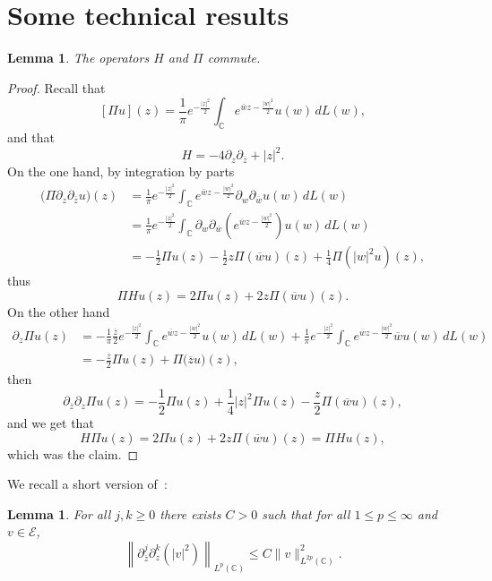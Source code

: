 \documentclass[10pt]{amsart}
\newtheorem{lemm}[theo]{Lemma}\newtheorem{prop}[theo]{Proposition}\newtheorem{coro}[theo]{Corollary}\newtheorem{conj}[theo]{Conjecture}
\theoremstyle{definition}\newtheorem{defi}[theo]{Definition}\newtheorem{rema}[theo]{Remark}\newtheorem{exam}[theo]{Example}\newtheorem{exem}[theo]{Example}\newtheorem{nota}[theo]{Notation}
\newcommand{\C}{\mathbb{C}}
\newcommand{\E}{\mathcal{E}}
\newcommand{\ov}{\overline}
\newcommand{\<}{\langle}
\renewcommand{\>}{\rangle}
\begin{document}
\section{Some technical results}



\begin{lemm}\label{lem-comm}
The operators $H$ and $\Pi$ commute.
\end{lemm}

\begin{proof}
Recall that
\[
[\Pi u](z) = \frac{1}{\pi} e^{-\frac{|z|^2}{2}} \int_\C e^{\ov w z - \frac{|w|^2}{2}} u(w) \,dL(w),
\]
and that
\[
H=-4\partial_z \partial_{\ov z}+|z|^2.
\]
On the one hand, by integration by parts
\begin{align*}
\big(\Pi \partial_z\partial_{\ov z} u\big)(z)&= \frac{1}{\pi} e^{-\frac{|z|^2}{2}} \int_\C e^{\ov w z - \frac{|w|^2}{2}} \partial_w\partial_{\ov w} u(w) \,dL(w)\\
&= \frac{1}{\pi} e^{-\frac{|z|^2}{2}} \int_\C \partial_w\partial_{\ov w} \left(e^{\ov w z - \frac{|w|^2}{2}}\right) u(w) \,dL(w)\\
&= -\frac12 \Pi u(z)-\frac12 z \Pi(\ov{w}u)(z)+\frac14 \Pi\left(|w|^2u\right)(z),
\end{align*}
thus
\[
\Pi Hu(z)=2\Pi u(z)+2z \Pi(\ov{w}u)(z).
\]
On the other hand
\begin{align*}
\partial_z \Pi u(z) &=- \frac{1}{\pi}\frac{\ov{z}}2 e^{-\frac{|z|^2}{2}} \int_\C e^{\ov w z - \frac{|w|^2}{2}} u(w) \,dL(w)+ \frac{1}{\pi} e^{-\frac{|z|^2}{2}} \int_\C e^{\ov w z - \frac{|w|^2}{2}} \ov{w}u(w) \,dL(w)\\
&=-\frac{\ov{z}}{2}\Pi u(z)+\Pi\big(\ov{z}u\big)(z),
\end{align*}
then
\[
\partial_{\ov z}\partial_z \Pi u(z)=-\frac{1}2 \Pi u(z)+ \frac14 |z|^2 \Pi u(z)-\frac{z}2\Pi(\ov{w}u)(z),
\]
and we get that
\[
H \Pi u(z)=2\Pi u(z)+2z \Pi(\ov{w}u)(z) =\Pi Hu(z),
\]
which was the claim.
\end{proof}


We recall a short version of~\cite[Lemma~A.2]{Schw-Tho}:
\begin{lemm}\label{lem.deri}
For all $ j, k \geq 0$ there exists $C>0$ such that for all $1\leq p \leq \infty$ and $v\in \E$,
\[
\left\| \partial^j_{\ov z}\partial^k_z\left(|v|^2\right)\right\|_{L^p(\C)} \leq C \| v\|^2_{L^{2p}(\C)}.
\]
\end{lemm}

\vspace{15pt}
\end{document}
